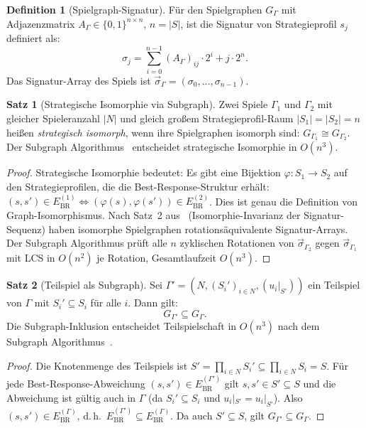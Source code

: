 ﻿\documentclass[a4paper,12pt]{article}
\theoremstyle{definition}
\newtheorem{definition}{Definition}
\newtheorem{satz}{Satz}
\begin{document}
\begin{definition}[Spielgraph-Signatur]
\label{def:spielsig}
F\"ur den Spielgraphen $G_\Gamma$ mit Adjazenzmatrix $A_\Gamma
\in \{0,1\}^{n \times n}$, $n = |S|$, ist die Signatur von
Strategieprofil $s_j$ definiert als:
\[
\sigma_j = \sum_{i=0}^{n-1} (A_\Gamma)_{ij} \cdot 2^i + j \cdot 2^n.
\]
Das Signatur-Array des Spiels ist
$\vec{\sigma}_\Gamma = (\sigma_0, \ldots, \sigma_{n-1})$.
\end{definition}

\begin{satz}[Strategische Isomorphie via Subgraph]
\label{satz:strat_iso}
Zwei Spiele $\Gamma_1$ und $\Gamma_2$ mit gleicher Spieleranzahl $|N|$
und gleich gro{\ss}em Strategieprofil-Raum $|S_1| = |S_2| = n$ hei{\ss}en
\emph{strategisch isomorph}, wenn ihre Spielgraphen isomorph sind:
$G_{\Gamma_1} \cong G_{\Gamma_2}$.
Der Subgraph Algorithmus~\cite{epp2026subgraph} entscheidet strategische
Isomorphie in $O(n^3)$.
\end{satz}

\begin{proof}
Strategische Isomorphie bedeutet: Es gibt eine Bijektion
$\varphi: S_1 \to S_2$ auf den Strategieprofilen, die die
Best-Response-Struktur erhält:
$(s, s') \in E_{\mathrm{BR}}^{(1)} \Leftrightarrow (\varphi(s), \varphi(s')) \in E_{\mathrm{BR}}^{(2)}$.
Dies ist genau die Definition von Graph-Isomorphismus.
Nach Satz~2 aus~\cite{epp2026subgraph} (Isomorphie-Invarianz der
Signatur-Sequenz) haben isomorphe Spielgraphen rotations\"aquivalente
Signatur-Arrays.
Der Subgraph Algorithmus pr\"uft alle $n$ zyklischen Rotationen von
$\vec{\sigma}_{\Gamma_2}$ gegen $\vec{\sigma}_{\Gamma_1}$ mit
LCS in $O(n^2)$ je Rotation, Gesamtlaufzeit $O(n^3)$.
\end{proof}

\begin{satz}[Teilspiel als Subgraph]
\label{satz:teilspiel}
Sei $\Gamma' = (N, (S_i')_{i \in N}, (u_i|_{S'}))$ ein Teilspiel von $\Gamma$
mit $S_i' \subseteq S_i$ f\"ur alle $i$. Dann gilt:
\[
G_{\Gamma'} \subseteq G_\Gamma.
\]
Die Subgraph-Inklusion entscheidet Teilspielschaft in $O(n^3)$ nach
dem Subgraph Algorithmus~\cite{epp2026subgraph}.
\end{satz}

\begin{proof}
Die Knotenmenge des Teilspiels ist
$S' = \prod_{i \in N} S_i' \subseteq \prod_{i \in N} S_i = S$.
F\"ur jede Best-Response-Abweichung $(s, s') \in E_{\mathrm{BR}}^{(\Gamma')}$
gilt $s, s' \in S' \subseteq S$ und die Abweichung ist g\"ultig auch in $\Gamma$
(da $S_i' \subseteq S_i$ und $u_i|_{S'} = u_i|_{S'}$).
Also $(s, s') \in E_{\mathrm{BR}}^{(\Gamma)}$, d.\,h.\
$E_{\mathrm{BR}}^{(\Gamma')} \subseteq E_{\mathrm{BR}}^{(\Gamma)}$.
Da auch $S' \subseteq S$, gilt $G_{\Gamma'} \subseteq G_\Gamma$.
\end{proof}
\end{document}
